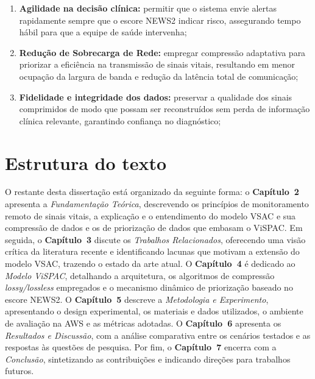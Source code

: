 \documentclass[twoside,english,brazilian]{UNISINOSmonografia}
\begin{document}
\begin{enumerate}
    \item \textbf{Agilidade na decisão clínica:} permitir que o sistema envie alertas rapidamente sempre que o escore NEWS2 indicar risco, assegurando tempo hábil para que a equipe de saúde intervenha;

    \item \textbf{Redução de Sobrecarga de Rede:} empregar compressão adaptativa para priorizar a eficiência na transmissão de sinais vitais, resultando em menor ocupação da largura de banda e redução da latência total de comunicação;
    
    \item \textbf{Fidelidade e integridade dos dados:} preservar a qualidade dos sinais comprimidos de modo que possam ser reconstruídos sem perda de informação clínica relevante, garantindo confiança no diagnóstico;
\end{enumerate}

\section{Estrutura do texto}

O restante desta dissertação está organizado da seguinte forma: o \textbf{Capítulo~2} apresenta a \textit{Fundamentação Teórica}, descrevendo os princípios de monitoramento remoto de sinais vitais, a explicação e o entendimento do modelo VSAC e sua compressão de dados e os de priorização de dados que embasam o ViSPAC.  
Em seguida, o \textbf{Capítulo~3} discute os \textit{Trabalhos Relacionados}, oferecendo uma visão crítica da literatura recente e identificando lacunas que motivam a extensão do modelo VSAC, trazendo o estado da arte atual. O \textbf{Capítulo~4} é dedicado ao \textit{Modelo ViSPAC}, detalhando a arquitetura, os algoritmos de compressão \textit{lossy/lossless} empregados e o mecanismo dinâmico de priorização baseado no escore NEWS2. O \textbf{Capítulo~5} descreve a \textit{Metodologia e Experimento}, apresentando o design experimental, os materiais e dados utilizados, o ambiente de avaliação na AWS e as métricas adotadas. O \textbf{Capítulo~6} apresenta os \textit{Resultados e Discussão}, com a análise comparativa entre os cenários testados e as respostas às questões de pesquisa. Por fim, o \textbf{Capítulo~7} encerra com a \textit{Conclusão}, sintetizando as contribuições e indicando direções para trabalhos futuros.


\end{document}
